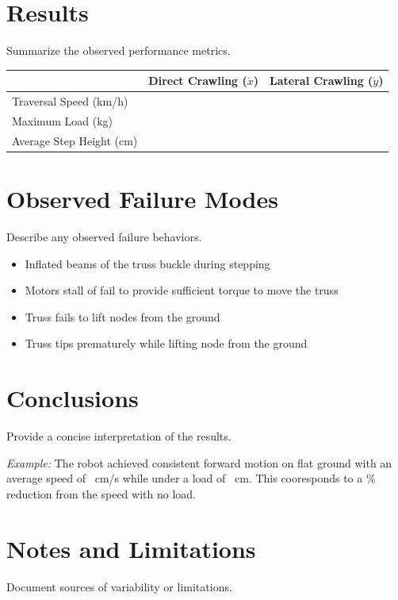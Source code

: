 \documentclass[11pt]{article}
\begin{document}
\section*{Results}
Summarize the observed performance metrics.

\begin{center}
\begin{tabular}{llc}
 & Direct Crawling ($\dot x$)&Lateral Crawling ($\dot y$)\\
\midrule
Traversal Speed (km/h)&   &\\
 Maximum Load (kg)& &\\
 Average Step Height (cm)& &\\
\end{tabular}
\end{center}

\section*{Observed Failure Modes}
Describe any observed failure behaviors.

\begin{itemize}[noitemsep]
    \item Inflated beams of the truss buckle during stepping
    \item Motors stall of fail to provide sufficient torque to move the truss
    \item Truss fails to lift nodes from the ground
    \item Truss tips prematurely while lifting node from the ground
\end{itemize}

\section*{Conclusions}
Provide a concise interpretation of the results.

\textit{Example:} The robot achieved consistent forward motion on flat ground with an average speed of \underline{\hspace{1cm}}~cm/s while under a load of \underline{\hspace{1cm}}~cm. This cooresponds to a \underline{\hspace{1cm}} \% reduction from the speed with no load. 

\section*{Notes and Limitations}
Document sources of variability or limitations.
\end{document}

